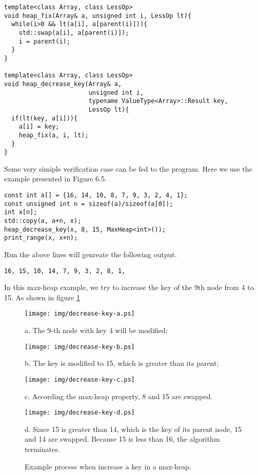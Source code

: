 \documentclass{article}
\begin{document}
\lstset{language=C++}
\begin{lstlisting}
template<class Array, class LessOp>
void heap_fix(Array& a, unsigned int i, LessOp lt){
  while(i>0 && lt(a[i], a[parent(i)])){
    std::swap(a[i], a[parent(i)]);
    i = parent(i);
  }
}

template<class Array, class LessOp>
void heap_decrease_key(Array& a, 
                       unsigned int i, 
                       typename ValueType<Array>::Result key,
                       LessOp lt){
  if(lt(key, a[i])){
    a[i] = key;
    heap_fix(a, i, lt);
  }
}
\end{lstlisting}

Some very simiple verification case can be fed to the program.
Here we use the example presented in \cite{CLRS} Figure 6.5.

\begin{lstlisting}
const int a[] = {16, 14, 10, 8, 7, 9, 3, 2, 4, 1};
const unsigned int n = sizeof(a)/sizeof(a[0]);
int x[n];
std::copy(a, a+n, x);
heap_decrease_key(x, 8, 15, MaxHeap<int>());
print_range(x, x+n);
\end{lstlisting}

Run the above lines will genreate the following output.
\begin{verbatim}
16, 15, 10, 14, 7, 9, 3, 2, 8, 1,
\end{verbatim}

In this max-heap example, we try to increase the key of the 9th node from 
4 to 15. As shown in figure \ref{fig:decrease-key}

\begin{figure}[htbp]
  \begin{center}
    \texttt{[image: img/decrease-key-a.ps]}

    a. The 9-th node with key 4 will be modified;

    \texttt{[image: img/decrease-key-b.ps]}

    b. The key is modified to 15, which is greater than its parent;

    \texttt{[image: img/decrease-key-c.ps]}

    c. According the max-heap property, 8 and 15 are swapped.

    \texttt{[image: img/decrease-key-d.ps]}

    d. Since 15 is greater than 14, which is the key of its parent node, 15 and 14 are swapped. Because 15 is less than 16, the algorithm terminates.
    
    \caption{Example process when increase a key in a max-heap.} \label{fig:decrease-key}
  \end{center}
\end{figure}
\end{document}
